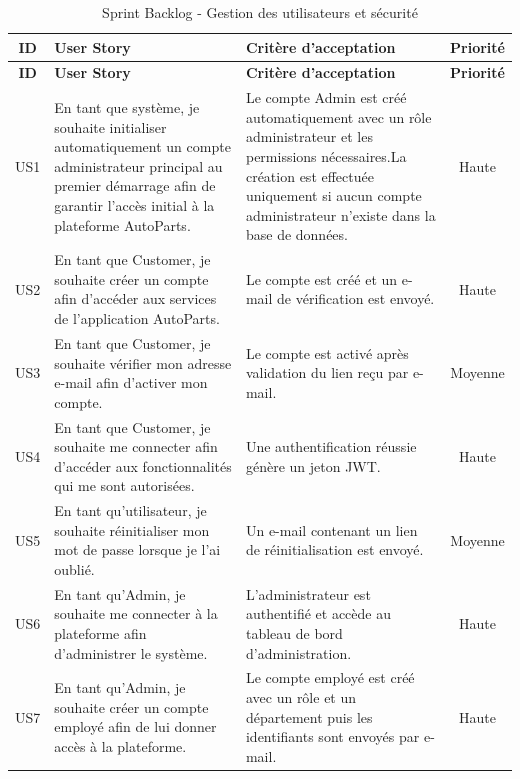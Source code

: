 \vspace{-0.5cm}
\begin{longtable}{|c|>{\RaggedRight\arraybackslash}p{5cm}|>{\RaggedRight\arraybackslash}p{5cm}|c|}
\caption{Sprint Backlog - Gestion des utilisateurs et sécurité}
\label{tab:sprint_backlog}\\
    \hline
\textbf{ID} & \textbf{User Story} & \textbf{Critère d'acceptation} & \textbf{Priorité}\\
\hline
\endfirsthead

\hline
\textbf{ID} & \textbf{User Story} & \textbf{Critère d'acceptation} & \textbf{Priorité}\\
\hline
\endhead


US1 &
En tant que système, je souhaite initialiser automatiquement un compte administrateur principal au premier démarrage afin de garantir l'accès initial à la plateforme AutoParts.  &
Le compte Admin est créé automatiquement avec un rôle administrateur et les permissions nécessaires.La création est effectuée uniquement si aucun compte administrateur n'existe dans la base de données.  &
Haute


\\
\hline


US2 &
En tant que Customer, je souhaite créer un compte afin d'accéder aux services de l'application AutoParts. &
Le compte est créé et un e-mail de vérification est envoyé. &
Haute
\\
\hline


US3 &
En tant que Customer, je souhaite vérifier mon adresse e-mail afin d'activer mon compte. &
Le compte est activé après validation du lien reçu par e-mail. &
Moyenne
\\
\hline


US4 &
En tant que Customer, je souhaite me connecter afin d'accéder aux fonctionnalités qui me sont autorisées. &
Une authentification réussie génère un jeton JWT. &
Haute
\\
\hline


US5 &
En tant qu'utilisateur, je souhaite réinitialiser mon mot de passe lorsque je l'ai oublié. &
Un e-mail contenant un lien de réinitialisation est envoyé. &
Moyenne
\\
\hline


US6 &
En tant qu'Admin, je souhaite me connecter à la plateforme afin d'administrer le système. &
L'administrateur est authentifié et accède au tableau de bord d'administration. &
Haute
\\
\hline


US7 &
En tant qu'Admin, je souhaite créer un compte employé afin de lui donner accès à la plateforme. &
Le compte employé est créé avec un rôle et un département puis les identifiants sont envoyés par e-mail. &
Haute
\\
\hline



\end{longtable}
